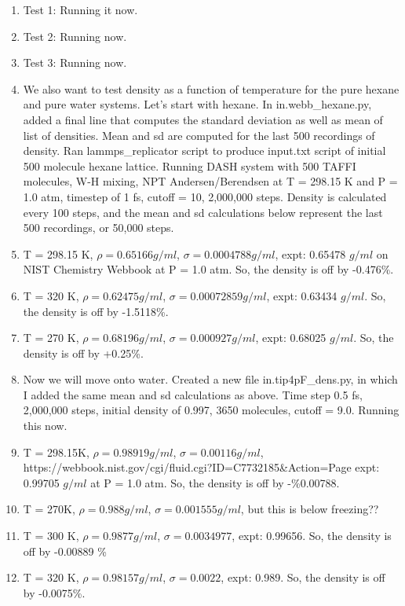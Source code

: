 \documentclass[12pt,reqno]{amsart}
\numberwithin{equation}{section}
\begin{document}
\begin{enumerate}
\item Test 1: Running it now.  
\item Test 2: Running now.  
\item Test 3: Running now.  

\item We also want to test density as a function of temperature for the pure hexane and pure water systems.  Let's start with hexane.  In in.webb\_hexane.py, added a final line that computes the standard deviation as well as mean of list of densities.  Mean and sd are computed for the last 500 recordings of density.  Ran lammps\_replicator script to produce input.txt script of initial 500 molecule hexane lattice.  Running DASH system with 500 TAFFI molecules, W-H mixing, NPT Andersen/Berendsen at T = 298.15 K and P = 1.0 atm, timestep of 1 fs, cutoff = 10, 2,000,000 steps.  Density is calculated every 100 steps, and the mean and sd calculations below represent the last 500 recordings, or 50,000 steps.  

\item T = 298.15 K, $\rho = 0.65166 g/ml$, $\sigma = 0.0004788 g/ml$, expt: 0.65478 $g/ml$ on NIST Chemistry Webbook at P = 1.0 atm.  So, the density is off by -0.476\%.  
\item T = 320 K, $\rho = 0.62475 g/ml$, $\sigma = 0.00072859 g/ml$, expt: 0.63434 $g/ml$.  So, the density is off by -1.5118\%.  
\item T = 270 K, $\rho = 0.68196 g/ml$, $\sigma = 0.000927 g/ml$, expt: 0.68025 $g/ml$.  So, the density is off by +0.25\%.  


\item Now we will move onto water.  Created a new file in.tip4pF\_dens.py, in which I added the same mean and sd calculations as above.  Time step 0.5 fs, 2,000,000 steps, initial density of 0.997, 3650 molecules, cutoff = 9.0.  Running this now.  

\item T = 298.15K, $\rho = 0.98919 g/ml$, $\sigma = 0.00116 g/ml$, https://webbook.nist.gov/cgi/fluid.cgi?ID=C7732185\&Action=Page expt: 0.99705 $g/ml$ at P = 1.0 atm.  So, the density is off by -\%0.00788.   
\item T = 270K, $\rho = 0.988 g/ml$, $\sigma = 0.001555 g/ml$, but this is below freezing??
\item T = 300 K, $\rho = 0.9877 g/ml$, $\sigma = 0.0034977$, expt: 0.99656.  So, the density is off by -0.00889 \%
\item T = 320 K, $\rho = 0.98157 g/ml$, $\sigma = 0.0022$, expt: 0.989.  So, the density is off by -0.0075\%.  



\end{enumerate}
\end{document}
